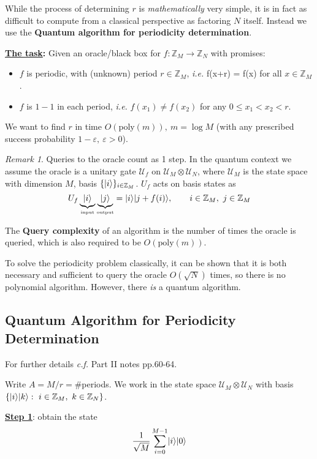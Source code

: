 \documentclass[]{article}
\DeclarePairedDelimiter\ket{\lvert}{\rangle}
\theoremstyle{custhm}
\theoremstyle{cusdef}
\theoremstyle{custhm}
\theoremstyle{custhm}
\theoremstyle{custhm}
\theoremstyle{custhm}
\theoremstyle{cusdef}
\theoremstyle{remark}
\newtheorem*{remark*}{Remark}
\newcommand{\Z}{\mathbb{Z}}
\newcommand{\ra}{\rightarrow}
\newcommand{\ie}{\textit{i.e. }}
\newcommand{\eps}{\varepsilon}
\newcommand{\poly}{\textrm{poly}}
\newcommand{\U}{\mathcal{U}}
\begin{document}
While the process of determining $r$ is \textit{mathematically} very simple, it is in fact as difficult to compute from a classical perspective as factoring $N$ itself. Instead we use the \textbf{Quantum algorithm for periodicity determination}.

\textbf{\underline{The task}:} Given an oracle/black box for $f:\Z_M \ra \Z_N$ with promises:
\begin{itemize}
	\item $f$ is periodic, with (unknown) period $r\in \Z_M$, \ie f(x+r) = f(x) for all $x\in \Z_M$.
	\item $f$ is $1-1$ in each period, \ie $f(x_1)\ne f(x_2)$ for any $0\le x_1 < x_2 < r$.
\end{itemize}

We want to find $r$ in time $O(\poly(m)),\ m = \log M$ (with any prescribed success probability $1-\eps,\ \eps > 0$).

\begin{remark*}
	Queries to the oracle count as 1 step. In the quantum context we assume the oracle is a unitary gate $\U_f$ on $\U_M\otimes \U_N$, where $\U_M$ is the state space with dimension $M$, basis $\{ \ket{i} \}_{i\in\Z_M}$. $U_f$ acts on basis states as
	\[
	U_f\underbrace{\ket{i}}_{\textrm{\tiny input}}\underbrace{\ket{j}}_{\textrm{\tiny output}} = \ket{i}\ket{j+f(i)},\qquad i\in\Z_M,\ j\in\Z_M
	\]
	
	The \textbf{Query complexity} of an algorithm is the number of times the oracle is queried, which is also required to be $O(\poly(m))$.
\end{remark*}

To solve the periodicity problem classically, it can be shown that it is both necessary and sufficient to query the oracle $O(\sqrt{N})$ times, so there is no polynomial algorithm. However, there \textit{is} a quantum algorithm.

\subsection{Quantum Algorithm for Periodicity Determination}

For further details \textit{c.f.} Part II notes pp.60-64.

Write $A = M/r = \#$periods. We work in the state space $\U_M\otimes\U_N$ with basis $\{\ket{i}\ket{k}:\ i\in\Z_M,\ k\in\Z_N\}$.

\underline{\textbf{Step 1}}: obtain the state \[ \frac{1}{\sqrt{M}} \sum_{i=0}^{M-1}\ket{i}\ket{0}\]
\end{document}
